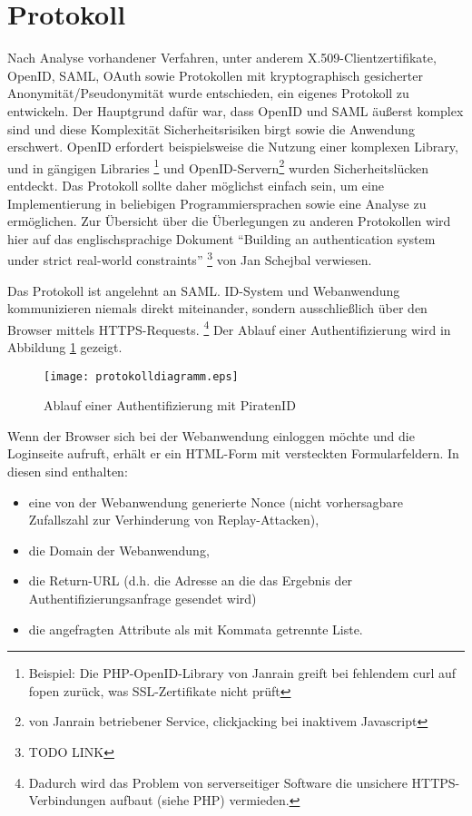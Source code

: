 \documentclass[parskip=half]{scrartcl}
\begin{document}
\section{Protokoll}
Nach Analyse vorhandener Verfahren, unter anderem X.509-Clientzertifikate, OpenID, SAML, OAuth sowie Protokollen mit kryptographisch gesicherter Anonymität/Pseudonymität
wurde entschieden, ein eigenes Protokoll zu entwickeln.
Der Hauptgrund dafür war, dass OpenID und SAML äußerst komplex sind und diese Komplexität Sicherheitsrisiken birgt sowie die Anwendung erschwert.
OpenID erfordert beispielsweise die Nutzung einer komplexen Library, und in gängigen Libraries
\footnote{Beispiel: Die PHP-OpenID-Library von Janrain greift bei fehlendem curl auf fopen zurück, was SSL-Zertifikate nicht prüft}
und OpenID-Servern\footnote{von Janrain betriebener Service, clickjacking bei inaktivem Javascript} wurden Sicherheitslücken entdeckt.
Das Protokoll sollte daher möglichst einfach sein, um eine Implementierung in beliebigen Programmiersprachen sowie eine Analyse zu ermöglichen.
Zur Übersicht über die Überlegungen zu anderen Protokollen wird hier auf das englischsprachige Dokument
"`Building an authentication system under strict real-world constraints"'
\footnote{TODO LINK} von Jan Schejbal verwiesen.

Das Protokoll ist angelehnt an SAML.
ID-System und Webanwendung kommunizieren niemals direkt miteinander, sondern ausschließlich über den Browser mittels HTTPS-Requests.
\footnote{Dadurch wird das Problem von serverseitiger Software die unsichere HTTPS-Verbindungen aufbaut (siehe PHP) vermieden.}
Der Ablauf einer Authentifizierung wird in Abbildung \ref{fig:protokolldiagramm} gezeigt.

\begin{figure}[h]
\texttt{[image: protokolldiagramm.eps]}
\caption{Ablauf einer Authentifizierung mit PiratenID}
\label{fig:protokolldiagramm}
\end{figure}

Wenn der Browser sich bei der Webanwendung einloggen möchte und die Loginseite aufruft, erhält er ein HTML-Form mit versteckten Formularfeldern.
In diesen sind enthalten:
\begin{itemize}
\item eine von der Webanwendung generierte Nonce (nicht vorhersagbare Zufallszahl zur Verhinderung von Replay-Attacken),
\item die Domain der Webanwendung,
\item die Return-URL (d.h. die Adresse an die das Ergebnis der Authentifizierungsanfrage gesendet wird)
\item die angefragten Attribute als mit Kommata getrennte Liste.
\end{itemize}
\end{document}
